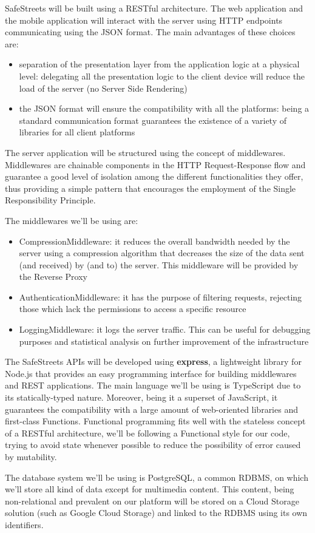 SafeStreets will be built using a RESTful architecture. The web application and the mobile application will interact with the server using
HTTP endpoints communicating using the JSON format.
The main advantages of these choices are:
\begin{itemize}
  \item separation of the presentation layer from the application logic at a physical level: delegating
  all the presentation logic to the client device will reduce the load of the server (no Server Side Rendering)
  \item the JSON format will ensure the compatibility with all the platforms: being a standard communication format
  guarantees the existence of a variety of libraries for all client platforms
\end{itemize}

The server application will be structured using the concept of middlewares.
Middlewares are chainable components in the HTTP Request-Response flow and guarantee a good
level of isolation among the different functionalities they offer, thus providing a simple pattern that
encourages the employment of the Single Responsibility Principle.

The middlewares we'll be using are:
\begin{itemize}
  \item CompressionMiddleware: it reduces the overall bandwidth needed by the server using a compression algorithm that decreases the size of the data sent (and received) by (and to) the server.
  This middleware will be provided by the Reverse Proxy
  \item AuthenticationMiddleware: it has the purpose of filtering requests, rejecting those which lack the permissions to access a specific resource
  \item LoggingMiddleware: it logs the server traffic. This can be useful for debugging purposes and statistical analysis on further improvement of the infrastructure
\end{itemize}

The SafeStreets APIs will be developed using \textbf{express}, a lightweight library for Node.js that provides an easy
programming interface for building middlewares and REST applications.
The main language we'll be using is TypeScript due to its statically-typed nature. Moreover, being it a superset of JavaScript,
it guarantees the compatibility with a large amount of web-oriented libraries and first-class Functions.
Functional programming fits well with the stateless concept of a RESTful architecture, we'll be following a Functional style for our code,
trying to avoid state whenever possible to reduce the possibility of error caused by mutability.

The database system we'll be using is PostgreSQL, a common RDBMS, on which we'll store all kind of data except for multimedia content. This content,
being non-relational and prevalent on our platform will be stored on a Cloud Storage solution (such as Google Cloud Storage) and linked to the RDBMS
using its own identifiers.
